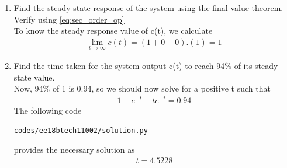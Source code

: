 \begin{enumerate}[label=\thesection.\arabic*.,ref=\thesection.\theenumi]
\begin{figure}
\caption{}
\label{fig:sec_order}
\end{figure}
\item Find the steady state response of the system using the final value theorem.  Verify using 
\ref{eq:sec_order_op}
\\
\solution 
To know the steady response value of c(t), we calculate 
\begin{align}
\lim_{t\to\infty} c(t) = (1+0+0).(1) = 1
\end{align}

\item Find the time taken for the system output c(t) to reach 94\% of its steady state value.
\\
\solution 
Now, 94\% of 1 is 0.94, so we should now solve for a positive t such that
\begin{align}
1 - e^{-t} - te^{-t} = 0.94
\end{align}
The following code 
%
\begin{lstlisting}
codes/ee18btech11002/solution.py
\end{lstlisting}
%
provides the necessary solution as 
\begin{align}
 t = 4.5228
\end{align}

\end{enumerate}
